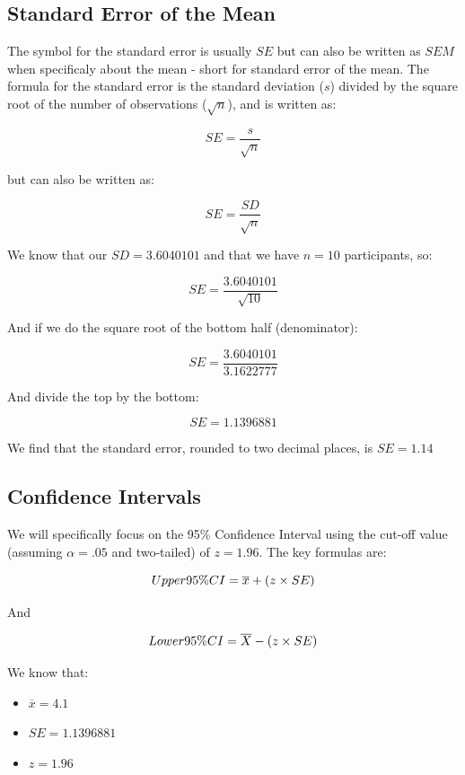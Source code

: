 \documentclass[
  oneside]{book}
\providecommand{\tightlist}{%
  \setlength{\itemsep}{0pt}\setlength{\parskip}{0pt}}
\begin{document}
\hypertarget{standard-error-of-the-mean}{%
\subsection{Standard Error of the Mean}\label{standard-error-of-the-mean}}

The symbol for the standard error is usually \(SE\) but can also be written as \(SEM\) when specificaly about the mean - short for standard error of the mean. The formula for the standard error is the standard deviation (\(s\)) divided by the square root of the number of observations (\(\sqrt{n}\)), and is written as:

\[SE = \frac{s}{\sqrt{n}}\]

but can also be written as:

\[SE = \frac{SD}{\sqrt{n}}\]

We know that our \(SD = 3.6040101\) and that we have \(n = 10\) participants, so:

\[SE = \frac{3.6040101}{\sqrt{10}}\]

And if we do the square root of the bottom half (denominator):

\[SE = \frac{3.6040101}{3.1622777}\]

And divide the top by the bottom:

\[SE = 1.1396881\]

We find that the standard error, rounded to two decimal places, is \(SE = 1.14\)

\hypertarget{confidence-intervals}{%
\subsection{Confidence Intervals}\label{confidence-intervals}}

We will specifically focus on the 95\% Confidence Interval using the cut-off value (assuming \(\alpha = .05\) and two-tailed) of \(z = 1.96\). The key formulas are:

\[Upper \space 95\%CI = \overline{x} + (z \times SE)\]

And

\[Lower \space 95\%CI = \overline{X} - (z \times SE)\]

We know that:

\begin{itemize}
\tightlist
\item
  \(\overline{x} = 4.1\)
\item
  \(SE = 1.1396881\)
\item
  \(z = 1.96\)
\end{itemize}
\end{document}

